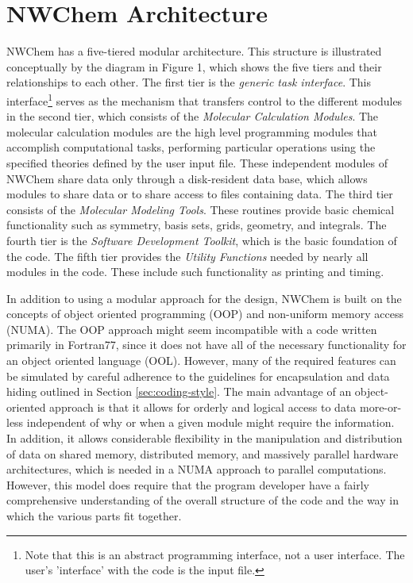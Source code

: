 \section{NWChem Architecture}
\label{sec:arch}

NWChem has a five-tiered modular architecture.  This structure is illustrated
conceptually by the diagram in Figure 1, which shows the five tiers and their
relationships to each other.
The first tier is the {\em generic task interface}.  This interface\footnote{Note that
this is an abstract programming interface, not a user interface.  The user's
'interface' with the code is the input file.} serves as the
mechanism that transfers control to the different modules in the second tier,
which consists of the {\em Molecular Calculation Modules}.
The molecular calculation modules are the high level programming
modules that accomplish computational tasks, performing particular operations
using the specified theories defined by the user input file.  These independent modules
of NWChem share data only through a disk-resident data base,
which allows modules to share data or to share access to files containing
data.
The third tier consists of the {\em Molecular
Modeling Tools}.  These routines provide basic chemical functionality such as symmetry,
basis sets, grids, geometry, and integrals.
The fourth tier is
the {\em Software
Development Toolkit}, which is the basic foundation of the code.
The fifth tier provides the {\em Utility Functions} needed by nearly all modules
in the code.  These include such functionality as printing 
and timing.

In addition to using a modular approach for the design, NWChem is built 
on the concepts of object oriented programming (OOP) and non-uniform memory
access (NUMA).  The OOP approach might seem incompatible with a code written primarily
in Fortran77, since it does not
have all of the necessary functionality for an object oriented language (OOL).
However, many of the required features can be simulated by careful adherence
to the guidelines for encapsulation and data hiding outlined
in Section \ref{sec:coding-style}.
The main advantage of an object-oriented approach is that it 
allows for orderly and logical access
to data more-or-less independent of why or when a given module might require
the information.  In addition, it allows considerable flexibility in the 
manipulation and
distribution of data on shared memory, distributed memory, and massively
parallel hardware architectures, which is needed in a NUMA approach to parallel
computations.  However, this model does require that the program
developer have a fairly comprehensive understanding of the overall structure
of the code and the way in which the various parts fit together.

